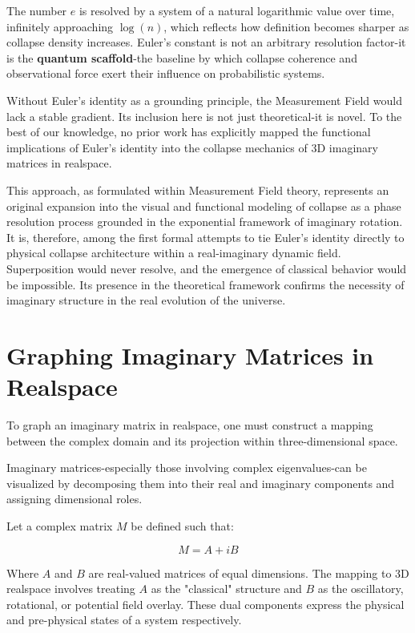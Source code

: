 The number $e$ is resolved by a system of a natural logarithmic value over time, infinitely approaching $\log(n)$, which reflects how definition becomes sharper as collapse density increases. \cite{imaginary_meta} Euler’s constant is not an arbitrary resolution factor-it is the \textbf{quantum scaffold}-the baseline by which collapse coherence and observational force exert their influence on probabilistic systems. \cite{imaginary_meta}

Without Euler’s identity as a grounding principle, the Measurement Field would lack a stable gradient.\cite{imaginary_meta} Its inclusion here is not just theoretical-it is novel. To the best of our knowledge, no prior work has explicitly mapped the functional implications of Euler’s identity into the collapse mechanics of 3D imaginary matrices in realspace. \cite{imaginary_meta}

This approach, as formulated within Measurement Field theory, represents an original expansion into the visual and functional modeling of collapse as a phase resolution process grounded in the exponential framework of imaginary rotation. \cite{imaginary_meta} It is, therefore, among the first formal attempts to tie Euler’s identity directly to physical collapse architecture within a real-imaginary dynamic field. \cite{imaginary_meta} Superposition would never resolve, and the emergence of classical behavior would be impossible. \cite{imaginary_meta} Its presence in the theoretical framework confirms the necessity of imaginary structure in the real evolution of the universe. 

\section{Graphing Imaginary Matrices in Realspace}

To graph an imaginary matrix in realspace, one must construct a mapping between the complex domain and its projection within three-dimensional space. \cite{imaginary_meta}

Imaginary matrices-especially those involving complex eigenvalues-can be visualized by decomposing them into their real and imaginary components and assigning dimensional roles. \cite{imaginary_meta}

Let a complex matrix $M$ be defined such that:

\[
M = A + iB
\]

Where $A$ and $B$ are real-valued matrices of equal dimensions. \cite{imaginary_meta} The mapping to 3D realspace involves treating $A$ as the "classical" structure and $B$ as the oscillatory, rotational, or potential field overlay. \cite{imaginary_meta} These dual components express the physical and pre-physical states of a system respectively. 

